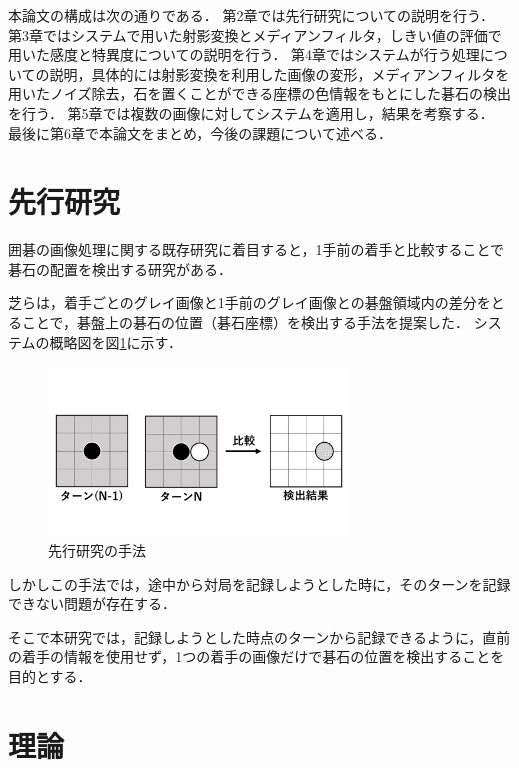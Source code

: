 \documentclass[openright]{nitocs}
\numberwithin{equation}{section}
\begin{document}
        本論文の構成は次の通りである．
        第2章では先行研究についての説明を行う．
        第3章ではシステムで用いた射影変換とメディアンフィルタ，しきい値の評価で用いた感度と特異度についての説明を行う．
        第4章ではシステムが行う処理についての説明，具体的には射影変換を利用した画像の変形，メディアンフィルタを用いたノイズ除去，石を置くことができる座標の色情報をもとにした碁石の検出を行う．
        第5章では複数の画像に対してシステムを適用し，結果を考察する．
        最後に第6章で本論文をまとめ，今後の課題について述べる．

    \section{先行研究} %
        囲碁の画像処理に関する既存研究に着目すると，1手前の着手と比較することで碁石の配置を検出する研究がある．

        芝らは，着手ごとのグレイ画像と1手前のグレイ画像との碁盤領域内の差分をとることで，碁盤上の碁石の位置（碁石座標）を検出する手法を提案した\cite{PilotStudy}．
        システムの概略図を図\ref{PS_img}に示す．
        \begin{figure}[tb] %
            \begin{center}
            \includegraphics[clip,width=80mm]{PilotStudy_image.jpg} 
            \caption{先行研究の手法}
            \label{PS_img}
            \end{center}
        \end{figure}

        しかしこの手法では，途中から対局を記録しようとした時に，そのターンを記録できない問題が存在する．

        そこで本研究では，記録しようとした時点のターンから記録できるように，直前の着手の情報を使用せず，1つの着手の画像だけで碁石の位置を検出することを目的とする．

    \section{理論} %
    \label{config}
\end{document}
